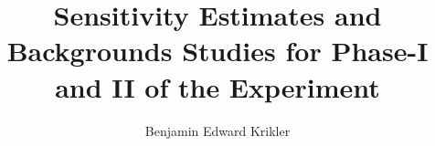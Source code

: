 \documentclass{thesis}
\title{Sensitivity Estimates and Backgrounds Studies for Phase-I and II of the \COMET Experiment}
\author{Benjamin Edward Krikler}
\begin{document}
\begin{frontmatter}
  
\end{frontmatter}

\begin{mainmatter}











\end{mainmatter}

%  

\begin{backmatter}
\end{backmatter}



\end{document}
